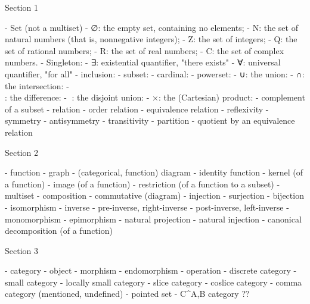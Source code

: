 Section 1

  - Set (not a multiset)
  - ∅: the empty set, containing no elements;
  - N: the set of natural numbers (that is, nonnegative integers);
  - Z: the set of integers;
  - Q: the set of rational numbers;
  - R: the set of real numbers;
  - C: the set of complex numbers.
  - Singleton:
  - ∃: existential quantifier, "there exists"
  - ∀: universal quantifier, "for all"
  - inclusion:
  - subset:
  - cardinal:
  - powerset:
  - ∪: the union:
  - ∩: the intersection:
  - \\: the difference:
  - : the disjoint union:
  - ×: the (Cartesian) product:
  - complement of a subset
  - relation
  - order relation
  - equivalence relation
  - reﬂexivity
  - symmetry
  - antisymmetry
  - transitivity
  - partition
  - quotient by an equivalence relation


Section 2

  - function
  - graph
  - (categorical, function) diagram
  - identity function
  - kernel (of a function)
  - image (of a function)
  - restriction (of a function to a subset)
  - multiset
  - composition
  - commutative (diagram)
  - injection
  - surjection
  - bijection
  - isomorphism
  - inverse
  - pre-inverse, right-inverse
  - post-inverse, left-inverse
  - monomorphism
  - epimorphism
  - natural projection
  - natural injection
  - canonical decomposition (of a function)


Section 3

  - category
  - object
  - morphism
  - endomorphism
  - operation
  - discrete category
  - small category
  - locally small category
  - slice category
  - coslice category
  - comma category (mentioned, undefined)
  - pointed set
  - C^A,B category ??